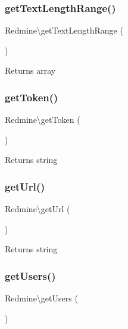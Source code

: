 \subsubsection{\texorpdfstring{get\+Text\+Length\+Range()}{getTextLengthRange()}}
{\footnotesize\ttfamily Redmine\textbackslash{}get\+Text\+Length\+Range (\begin{DoxyParamCaption}{ }\end{DoxyParamCaption})}

\begin{DoxyReturn}{Returns}
array 
\end{DoxyReturn}
\mbox{\label{namespace_redmine_ab2f1e25f6992a73d074aaeb368e2bdc0}} 
\subsubsection{\texorpdfstring{get\+Token()}{getToken()}}
{\footnotesize\ttfamily Redmine\textbackslash{}get\+Token (\begin{DoxyParamCaption}{ }\end{DoxyParamCaption})}

\begin{DoxyReturn}{Returns}
string 
\end{DoxyReturn}
\mbox{\label{namespace_redmine_a2ccb575a43abede07a2cdbe8bfea24fa}} 
\subsubsection{\texorpdfstring{get\+Url()}{getUrl()}}
{\footnotesize\ttfamily Redmine\textbackslash{}get\+Url (\begin{DoxyParamCaption}{ }\end{DoxyParamCaption})}

\begin{DoxyReturn}{Returns}
string 
\end{DoxyReturn}
\mbox{\label{namespace_redmine_a209ad0ad13e2884eda66992c4d377a4d}} 
\subsubsection{\texorpdfstring{get\+Users()}{getUsers()}}
{\footnotesize\ttfamily Redmine\textbackslash{}get\+Users (\begin{DoxyParamCaption}{ }\end{DoxyParamCaption})}

